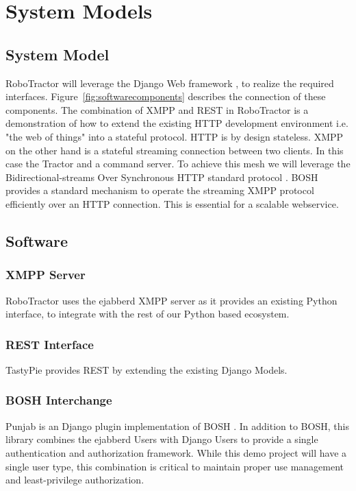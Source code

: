 \documentclass[conference,12pt]{IEEEtran}
\begin{document}
\section{System Models}

\subsection{System Model}
RoboTractor will leverage the Django Web framework \autocite{_django_2014}
, to realize the required
interfaces.  Figure~\ref{fig:softwarecomponents} describes the connection of
these components.  The combination of XMPP and REST in RoboTractor is
a demonstration of how to extend the existing HTTP development environment
i.e. "the web of things" into a stateful protocol. HTTP is by design
stateless. XMPP on the other hand is a stateful streaming connection between two
clients. In this case the Tractor and a command server.  To achieve this mesh we
will leverage the Bidirectional-streams Over Synchronous HTTP standard
protocol \autocite{paterson_bidirectional-streams_2010}. BOSH provides
a standard mechanism to operate the streaming XMPP protocol efficiently over an
HTTP connection. This is essential for a scalable webservice. 
\subsection{Software}
\subsubsection{XMPP Server}
RoboTractor uses the ejabberd \autocite{_ejabberd} XMPP server as it provides an existing Python
interface, to integrate with the rest of our Python based ecosystem.
\subsubsection{REST Interface}
TastyPie provides REST \autocite{_toastdriven/django-tastypie_2014} by extending
the existing Django Models.
\subsubsection{BOSH Interchange}
Punjab is an Django plugin implementation of BOSH
\autocite{_twonds/punjab_2014}.  In addition to BOSH, this library combines
the ejabberd Users with Django Users to provide a single authentication and
authorization framework. While this demo project will have a single user type,
this combination is critical to maintain proper use management and
least-privilege authorization.
\end{document}
